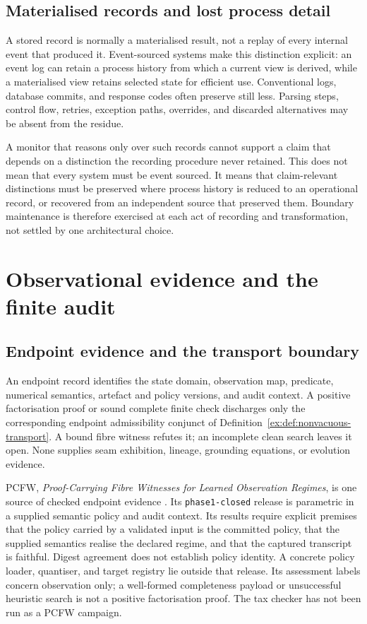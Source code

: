 \documentclass[smallextended,envcountsect,envcountsame,natbib]{svjour3}
\newcommand{\code}[1]{\texttt{#1}}
\begin{document}
\subsection{Materialised records and lost process detail}\label{ex:sec:settlement}

A stored record is normally a materialised result, not a replay of every internal event that produced it. Event-sourced systems make this distinction explicit: an event log can retain a process history from which a current view is derived, while a materialised view retains selected state for efficient use. Conventional logs, database commits, and response codes often preserve still less. Parsing steps, control flow, retries, exception paths, overrides, and discarded alternatives may be absent from the residue.

A monitor that reasons only over such records cannot support a claim that depends on a distinction the recording procedure never retained. This does not mean that every system must be event sourced. It means that claim-relevant distinctions must be preserved where process history is reduced to an operational record, or recovered from an independent source that preserved them. Boundary maintenance is therefore exercised at each act of recording and transformation, not settled by one architectural choice.

\section{Observational evidence and the finite audit}\label{ex:sec:observational}
\subsection{Endpoint evidence and the transport boundary}\label{ex:sec:pcfw}

An endpoint record identifies the state domain, observation map, predicate, numerical semantics, artefact and policy versions, and audit context. A positive factorisation proof or sound complete finite check discharges only the corresponding endpoint admissibility conjunct of Definition~\ref{ex:def:nonvacuous-transport}. A bound fibre witness refutes it; an incomplete clean search leaves it open. None supplies seam exhibition, lineage, grounding equations, or evolution evidence.

PCFW, \emph{Proof-Carrying Fibre Witnesses for Learned Observation Regimes}, is one source of checked endpoint evidence \citep{moore2026pcfw}. Its \code{phase1-closed} release is parametric in a supplied semantic policy and audit context. Its results require explicit premises that the policy carried by a validated input is the committed policy, that the supplied semantics realise the declared regime, and that the captured transcript is faithful. Digest agreement does not establish policy identity. A concrete policy loader, quantiser, and target registry lie outside that release. Its assessment labels concern observation only; a well-formed completeness payload or unsuccessful heuristic search is not a positive factorisation proof. The tax checker has not been run as a PCFW campaign.
\end{document}
